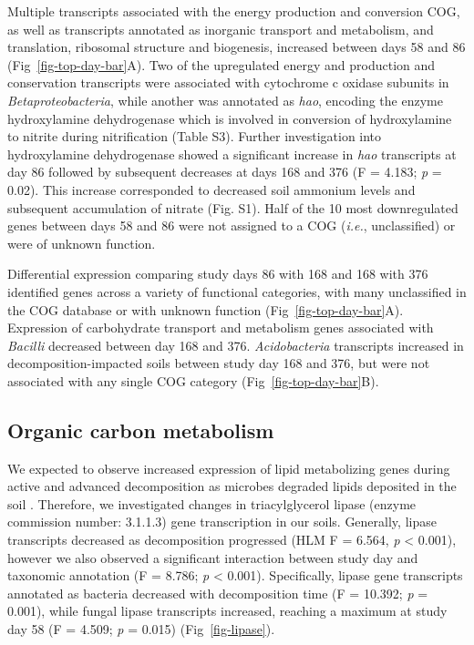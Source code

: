 \documentclass[
  sn-nature,
  lineno, referee]{sn-jnl}
\begin{document}
Multiple transcripts associated with the energy production and
conversion COG, as well as transcripts annotated as inorganic transport
and metabolism, and translation, ribosomal structure and biogenesis,
increased between days 58 and 86 (Fig~\ref{fig-top-day-bar}A). Two of
the upregulated energy and production and conservation transcripts were
associated with cytochrome c oxidase subunits in
\emph{Betaproteobacteria}, while another was annotated as \emph{hao},
encoding the enzyme hydroxylamine dehydrogenase which is involved in
conversion of hydroxylamine to nitrite during nitrification (Table S3).
Further investigation into hydroxylamine dehydrogenase showed a
significant increase in \emph{hao} transcripts at day 86 followed by
subsequent decreases at days 168 and 376 (F = 4.183; \emph{p} = 0.02).
This increase corresponded to decreased soil ammonium levels and
subsequent accumulation of nitrate (Fig. S1). Half of the 10 most
downregulated genes between days 58 and 86 were not assigned to a COG
(\emph{i.e.}, unclassified) or were of unknown function.

Differential expression comparing study days 86 with 168 and 168 with
376 identified genes across a variety of functional categories, with
many unclassified in the COG database or with unknown function
(Fig~\ref{fig-top-day-bar}A). Expression of carbohydrate transport and
metabolism genes associated with \emph{Bacilli} decreased between day
168 and 376. \emph{Acidobacteria} transcripts increased in
decomposition-impacted soils between study day 168 and 376, but were not
associated with any single COG category (Fig~\ref{fig-top-day-bar}B).

\subsection{Organic carbon metabolism}\label{organic-carbon-metabolism}

We expected to observe increased expression of lipid metabolizing genes
during active and advanced decomposition as microbes degraded lipids
deposited in the soil \citep{howard_characterization_2010}. Therefore,
we investigated changes in triacylglycerol lipase (enzyme commission
number: 3.1.1.3) gene transcription in our soils. Generally, lipase
transcripts decreased as decomposition progressed (HLM F = 6.564,
\emph{p} \textless{} 0.001), however we also observed a significant
interaction between study day and taxonomic annotation (F = 8.786;
\emph{p} \textless{} 0.001). Specifically, lipase gene transcripts
annotated as bacteria decreased with decomposition time (F = 10.392;
\emph{p} = 0.001), while fungal lipase transcripts increased, reaching a
maximum at study day 58 (F = 4.509; \emph{p} = 0.015)
(Fig~\ref{fig-lipase}).
\end{document}

